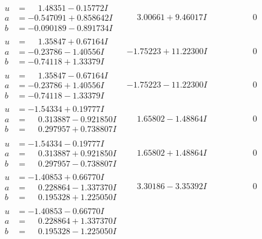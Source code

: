 \documentclass[1p]{elsarticle_modified}
\theoremstyle{definition}
\begin{document}
$$\begin{array}{c|c|c}
\begin{aligned}
u &= \phantom{-}1.48351 - 0.15772 I \\
a &= -0.547091 + 0.858642 I \\
b &= -0.090189 - 0.891734 I\end{aligned}
 & \phantom{-}3.00661 + 9.46017 I & \phantom{-0.000000 } 0 \\ \hline\begin{aligned}
u &= \phantom{-}1.35847 + 0.67164 I \\
a &= -0.23786 - 1.40556 I \\
b &= -0.74118 + 1.33379 I\end{aligned}
 & -1.75223 + 11.22300 I & \phantom{-0.000000 } 0 \\ \hline\begin{aligned}
u &= \phantom{-}1.35847 - 0.67164 I \\
a &= -0.23786 + 1.40556 I \\
b &= -0.74118 - 1.33379 I\end{aligned}
 & -1.75223 - 11.22300 I & \phantom{-0.000000 } 0 \\ \hline\begin{aligned}
u &= -1.54334 + 0.19777 I \\
a &= \phantom{-}0.313887 - 0.921850 I \\
b &= \phantom{-}0.297957 + 0.738807 I\end{aligned}
 & \phantom{-}1.65802 - 1.48864 I & \phantom{-0.000000 } 0 \\ \hline\begin{aligned}
u &= -1.54334 - 0.19777 I \\
a &= \phantom{-}0.313887 + 0.921850 I \\
b &= \phantom{-}0.297957 - 0.738807 I\end{aligned}
 & \phantom{-}1.65802 + 1.48864 I & \phantom{-0.000000 } 0 \\ \hline\begin{aligned}
u &= -1.40853 + 0.66770 I \\
a &= \phantom{-}0.228864 - 1.337370 I \\
b &= \phantom{-}0.195328 + 1.225050 I\end{aligned}
 & \phantom{-}3.30186 - 3.35392 I & \phantom{-0.000000 } 0 \\ \hline\begin{aligned}
u &= -1.40853 - 0.66770 I \\
a &= \phantom{-}0.228864 + 1.337370 I \\
b &= \phantom{-}0.195328 - 1.225050 I\end{aligned}

\end{array}$$
\end{document}
